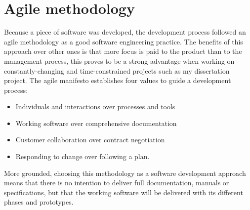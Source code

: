 \section{Agile methodology}
Because a piece of software was developed, the development process followed an agile methodology as a good software engineering practice. The benefits of this approach over other ones is that more focus is paid to the product than to the management process, this proves to be a strong advantage when working on constantly-changing and time-constrained projects such as my dissertation project.
The agile manifesto \cite{Martin2002} establishes four values to guide a development process: 
\begin{itemize}
  \item Individuals and interactions over processes and tools
  \item Working software over comprehensive documentation
  \item Customer collaboration over contract negotiation
  \item Responding to change over following a plan. 
\end{itemize}

More grounded, choosing this methodology as a software development approach means that there is no intention to deliver full documentation, manuals or specifications, but that the working software will be delivered with its different phases and prototypes. 

\iffalse
\subsection{Self-management}
Versioning software was used to manage the workflow of the different components of the system, the repositories are available online in a public GitHub repository. Links
\fi